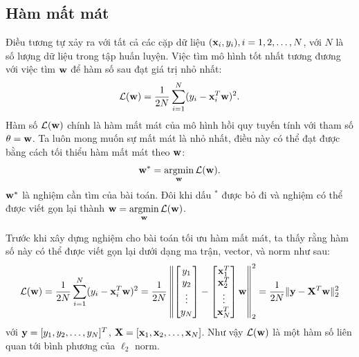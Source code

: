 \subsection{Hàm mất mát}

Điều tương tự xảy ra với tất cả các cặp dữ liệu $(\mathbf{x}_i, y_i), i = 1, 2, \dots,
N $, với $N$ là số lượng dữ liệu trong tập huấn luyện. Việc tìm mô hình tốt nhất tương đương với việc tìm $\mathbf{w}$ để hàm số sau
đạt giá trị nhỏ nhất:
\begin{equation}
\label{eqn:3_2}
\mathcal{L}(\mathbf{w}) = \frac{1}{2N}\sum_{i=1}^N (y_i - \mathbf{x}_i^T\mathbf{w})^2.
\end{equation}
Hàm số $\mathcal{L}(\mathbf{w})$ chính là hàm mất mát của mô hình hồi quy tuyến tính với tham số $\theta = \mathbf{w}$. Ta luôn mong muốn sự
mất mát là nhỏ nhất, điều này có thể
đạt được bằng cách tối thiểu hàm mất mát theo $\mathbf{w}$:
\begin{equation}
\label{eqn:3_4}
\mathbf{w}^* = \operatorname*{argmin}_{\mathbf{w}} \mathcal{L}(\mathbf{w}).
\end{equation}
$\mathbf{w}^*$ là nghiệm cần tìm của bài toán. Đôi khi dấu $^*$ được bỏ đi và nghiệm có thể được viết gọn lại thành $\displaystyle \mathbf{w} = \operatorname*{argmin}_{\mathbf{w}}\mathcal{L}(\mathbf{w})$.




Trước khi xây dựng nghiệm cho bài toán tối ưu hàm mất mát, ta thấy rằng hàm
số này có thể được viết gọn lại dưới dạng ma trận, vector, và norm như sau:
\begin{equation}
\mathcal{L}(\mathbf{w}) = \frac{1}{2N}\sum_{i=1}^N (y_i - \mathbf{x}_i^T\mathbf{w})^2
= \frac{1}{2N} \left\|\left[\begin{matrix} y_1 \\y_2 \\\vdots \\ y_N  \end{matrix}\right] -
\left[\begin{matrix} \mathbf{x}_1^T \\ \mathbf{x}_2^T \\ \vdots \\ \mathbf{x}_N^T \end{matrix}\right] \mathbf{w}
\right\|_2^2 = \frac{1}{2N} \| \mathbf{y} - \mathbf{X}^T\mathbf{w}\|_2^2
\end{equation}
với $\mathbf{y} = [y_1, y_2, \dots, y_N]^T$, $\mathbf{X} = [\mathbf{x}_1, \mathbf{x}_2, \dots, \mathbf{x}_N]$.
Như vậy $\mathcal{L}(\mathbf{w})$ là một hàm số liên quan tới bình phương của $\ell_2$ norm.







